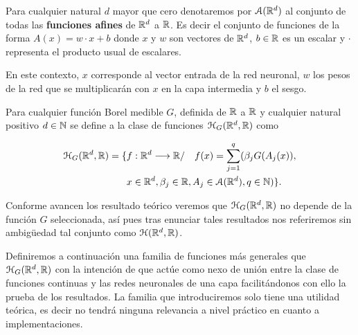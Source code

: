 Para cualquier natural $d$ mayor que cero  denotaremos por $\mathcal{A}(\mathbb{R}^d)$ al conjunto de todas 
las \textbf{funciones afines} de $\mathbb{R}^d$ a $\mathbb{R}$. Es decir el conjunto de funciones de la forma 
$A(x) = w \cdot x + b$ donde $x$ y $w$ son vectores de $\mathbb{R}^d$,  $b \in \mathbb{R}$ es un escalar
 y $\cdot$ representa el producto 
usual de escalares.  
    
En este contexto, $x$ corresponde al vector entrada de la red neuronal, $w$ los pesos de la red
que se multiplicarán con $x$ en la capa intermedia y $b$ el sesgo. 




\begin{definicion} 
    Para cualquier función Borel medible $G$, definida de $\mathbb{R}$ a $\mathbb{R}$ y cualquier natural positivo
    $d \in \mathbb{N}$ se define a la clase de funciones $\mathcal{H}_G(\mathbb{R}^d,\mathbb{R})$ como 

    \begin{equation}
        \begin{split}
        \mathcal{H}_G(\mathbb{R}^d,\mathbb{R}) = 
        \{ 
            & f: \mathbb{R} ^d \longrightarrow \mathbb{R} / \quad
            f(x)=\sum_{j = 1} ^q (
            \beta_j G(A_{j}(x)), \\
            & x  \in \mathbb{R} ^d, \beta_j \in \mathbb{R}, A_{j}\in \mathcal{A}(\mathbb{R}^d),q \in \mathbb{N}
            )
        \}.
        \end{split}
    \end{equation}

    Conforme avancen los resultado teórico veremos que $\mathcal{H}_G(\mathbb{R}^d,\mathbb{R})$ 
    no depende de la función $G$ seleccionada, así pues tras enunciar tales resultados nos referiremos sin ambigüedad tal conjunto como $\mathcal{H}(\mathbb{R}^d,\mathbb{R})$.
\end{definicion}

Definiremos a continuación una familia de funciones más generales que $\mathcal{H}_G(\mathbb{R}^d,\mathbb{R})$ con la intención de que actúe como nexo de unión entre la clase de funciones continuas y las redes neuronales de una capa facilitándonos con ello la prueba de los resultados. La familia que introduciremos solo tiene 
una utilidad teórica, es decir no tendrá ninguna relevancia a nivel práctico en cuanto a implementaciones.
   

